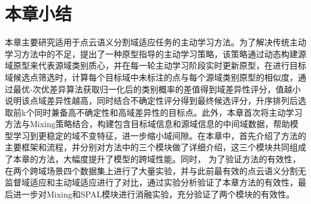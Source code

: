 \section{本章小结}
本章主要研究适用于点云语义分割域适应任务的主动学习方法。为了解决传统主动学习方法中的不足，提出了一种原型指导的主动学习策略，该策略通过动态构建源域原型来代表源域类别质心，并在每一轮主动学习阶段实时更新原型，在进行目标域候选点筛选时，计算每个目标域中未标注的点与每个源域类别原型的相似度，通过最优-次优差异算法获取归一化后的类别概率的差值得到域差异性评分，值越小说明该点域差异性越高，同时结合不确定性评分得到最终候选评分，升序排列后选取前k个同时兼备高不确定性和高域差异性的目标点。此外，本章首次将主动学习方法与Mixing策略结合，构建包含目标域信息和源域信息的中间域数据，帮助模型学习到更稳定的域不变特征，进一步缩小域间隙。在本章中，首先介绍了方法的主要框架和流程，并分别对方法中的三个模块做了详细介绍，这三个模块共同组成了本章的方法，大幅度提升了模型的跨域性能。同时， 为了验证方法的有效性，在两个跨域场景四个数据集上进行了大量实验，并与此前最有效的点云语义分割无监督域适应和主动域适应进行了对比，通过实验分析验证了本章方法的有效性，最后进一步对Mixing和SPAL模块进行消融实验，充分验证了两个模块的有效性。

